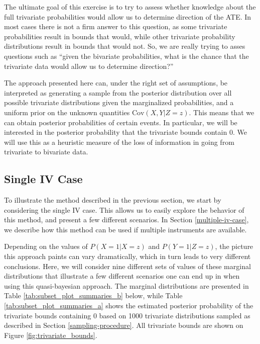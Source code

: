 \documentclass[
]{article}
\theoremstyle{plain}
\begin{document}
{The ultimate goal of this exercise is to try to assess whether knowledge about the full trivariate probabilities would allow us to determine direction of the ATE. In most cases there is not a firm answer to this question, as some trivariate probabilities result in bounds that would, while other trivariate probability distributions result in bounds that would not. So, we are really trying to asses questions such as ``given the bivariate probabilities, what is the chance that the trivariate data would allow us to determine direction?''

The approach presented here can, under the right set of assumptions, be interpreted as generating a sample from the posterior distribution over all possible trivariate distributions given the marginalized probabilities, and a uniform prior on the unknown quantities \(\text{Cov}(X, Y | Z = z)\). This means that we can obtain posterior probabilities of certain events. In particular, we will be interested in the posterior probability that the trivariate bounds contain \(0\). We will use this as a heuristic measure of the loss of information in going from trivariate to bivariate data.

\hypertarget{single-iv-case}{%
\subsection{Single IV Case}\label{single-iv-case}}

To illustrate the method described in the previous section, we start by considering the single IV case. This allows us to easily explore the behavior of this method, and present a few different scenarios. In Section \ref{multiple-iv-case}, we describe how this method can be used if multiple instruments are available.

Depending on the values of \(P(X = 1 | X = z)\) and \(P(Y = 1 | Z = z)\), the picture this approach paints can vary dramatically, which in turn leads to very different conclusions. Here, we will consider nine different sets of values of these marginal distributions that illustrate a few different scenarios one can end up in when using this quasi-bayesian approach. The marginal distributions are presented in Table \ref{tab:subset_plot_summaries_b} below, while Table \ref{tab:subset_plot_summaries_a} shows the estimated posterior probability of the trivariate bounds containing \(0\) based on 1000 trivariate distributions sampled as described in Section \ref{sampling-procedure}. All trivariate bounds are shown on Figure \ref{fig:trivariate_bounds}.

}
\end{document}

